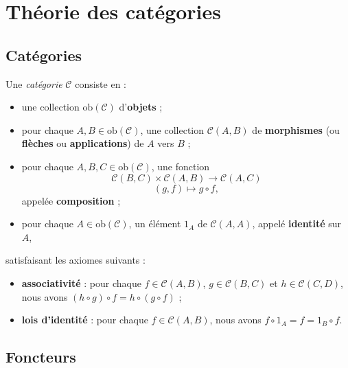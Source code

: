 \chapter{Théorie des catégories}

\section{Catégories}

\begin{definition}
Une \emph{catégorie} $\mathscr{C}$ consiste en :

\begin{itemize}
\item une collection $\text{ob}(\mathscr{C})$ d'\textbf{objets} ;
\item pour chaque $A, B \in \text{ob}(\mathscr{C})$, une collection $\mathscr{C}(A, B)$ de \textbf{morphismes} (ou \textbf{flèches} ou \textbf{applications}) de $A$ vers $B$ ;
\item pour chaque $A, B, C \in \text{ob}(\mathscr{C})$, une fonction
$$\mathscr{C}(B, C) \times \mathscr{C}(A, B) \longrightarrow \mathscr{C}(A, C)$$
$$(g, f) \longmapsto g \circ f,$$
appelée \textbf{composition} ;
\item pour chaque $A \in \text{ob}(\mathscr{C})$, un élément $1_A$ de $\mathscr{C}(A, A)$, appelé \textbf{identité} sur $A$,
\end{itemize}

satisfaisant les axiomes suivants :

\begin{itemize}
\item \textbf{associativité} : pour chaque $f \in \mathscr{C}(A, B)$, $g \in \mathscr{C}(B, C)$ et $h \in \mathscr{C}(C, D)$, nous avons $(h \circ g) \circ f = h \circ (g \circ f)$ ;
\item \textbf{lois d'identité} : pour chaque $f \in \mathscr{C}(A, B)$, nous avons $f \circ 1_A = f = 1_B \circ f$.
\end{itemize}
\end{definition}

\section{Foncteurs}

